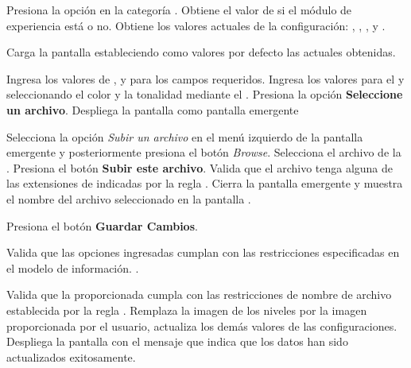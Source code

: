\begin{UCtrayectoria}%
   

  \Actor Presiona la opción {\bf {}} en la categoría
         .
  \Sistema Obtiene el valor de si el módulo de experiencia está  o no. 
  \Sistema Obtiene los valores actuales de la configuración:
           ,
           ,
           ,
            y
           .

  \Sistema Carga la pantalla  estableciendo como valores por defecto
           las  actuales obtenidas.

  \Actor Ingresa los valores de ,
          y
          para los campos requeridos.
         \label{CU-E02-1.formulario}
  \Actor Ingresa los valores para el  y
          seleccionando el color y la
         tonalidad mediante el . 
         \label{CU-E02-1.color}
  \Actor Presiona la opción {\bf Seleccione un archivo}. 
  \Sistema Despliega la pantalla  como pantalla emergente
           \label{CU-E02-1.seleccion-archivo}

  \Actor Selecciona la opción {\it Subir un archivo} en el menú izquierdo de la
         pantalla emergente y posteriormente presiona el botón {\it Browse}.
  \Actor Selecciona el archivo de la .
  \Actor Presiona el botón {\bf Subir este archivo}.
  \Sistema Valida que el archivo tenga alguna de las extensiones de indicadas
           por la regla . 
  \Sistema Cierra la pantalla emergente y muestra el nombre del archivo seleccionado
           en la pantalla .


  \Actor Presiona el botón {\bf Guardar Cambios}.  \label{CU-E02-1.validacion}

  \Sistema Valida que las opciones ingresadas cumplan con las restricciones
           especificadas en el modelo de información. .

  \Sistema Valida que la  proporcionada cumpla con
           las restricciones de nombre de archivo establecida por la regla
           . 
  \Sistema Remplaza la imagen de los niveles por la imagen proporcionada por el usuario,
           actualiza los demás valores de las configuraciones. 
  \Sistema Despliega la pantalla  con el mensaje que indica que
           los datos han sido actualizados exitosamente.
\end{UCtrayectoria}

